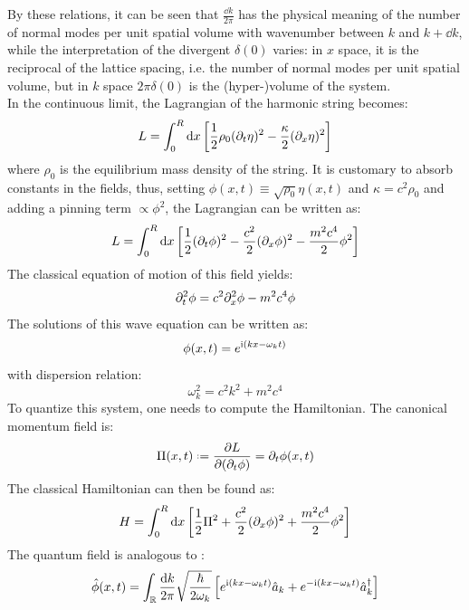 By these relations, it can be seen that $ \frac{\dd k}{2\pi} $ has the physical meaning of the number of normal modes per unit spatial volume with wavenumber between $ k $ and $ k + \dd k $, while the interpretation of the divergent $ \delta(0) $ varies: in $ x $ space, it is the reciprocal of the lattice spacing, i.e. the number of normal modes per unit spatial volume, but in $ k $ space $ 2\pi \delta(0) $ is the (hyper-)volume of the system.\\
In the continuous limit, the Lagrangian of the harmonic string becomes:
\begin{equation*}
  L = \int_0^R \mathrm{d} x \left[ \frac{1}{2} \rho_0 (\partial_t \eta)^2 - \frac{\kappa}{2} (\partial_x \eta)^2 \right]
\end{equation*}
where $ \rho_0 $ is the equilibrium mass density of the string. It is customary to absorb constants in the fields, thus, setting $ \phi(x,t) \equiv \sqrt{\rho_0} \eta(x,t) $ and $ \kappa = c^2 \rho_0 $ and adding a pinning term $ \propto \phi^2 $, the Lagrangian can be written as:
\begin{equation}
  L = \int_0^R \mathrm{d} x \left[ \frac{1}{2} (\partial_t \phi)^2 - \frac{c^2}{2} (\partial_x \phi)^2 - \frac{m^2 c^4}{2} \phi^2 \right]
\end{equation}
The classical equation of motion of this field yields:
\begin{equation}
  \partial_t^2 \phi = c^2 \partial_x^2 \phi - m^2 c^4 \phi
\end{equation}
The solutions of this wave equation can be written as:
\begin{equation}
  \phi(x,t) = e^{\mathrm{i} \left( kx - \omega_k t \right)}
\end{equation}
with dispersion relation:
\begin{equation}
  \omega_k^2 = c^2 k^2 + m^2 c^4
\end{equation}
To quantize this system, one needs to compute the Hamiltonian. The canonical momentum field is:
\begin{equation}
  \Pi(x,t) \defeq \frac{\pa L}{\pa (\pa_t \phi)} = \pa_t \phi(x,t)
\end{equation}
The classical Hamiltonian can then be found as:
\begin{equation}
  H = \int_0^R \mathrm{d} x \left[ \frac{1}{2} \Pi^2 + \frac{c^2}{2} (\partial_x \phi)^2 + \frac{m^2 c^4}{2} \phi^2 \right]
\end{equation}
The quantum field is analogous to :
\begin{equation}
  \hat\phi(x,t) = \int_{\mathbb{R}} \frac{\mathrm{d} k}{2\pi} \sqrt{\frac{\hbar}{2\omega_k}} \left[ e^{\mathrm{i} \left( kx - \omega_k t \right)} \hat{a}_k + e^{-\mathrm{i} \left( kx - \omega_k t \right)} \hat{a}_k^\dagger \right]
\end{equation}
